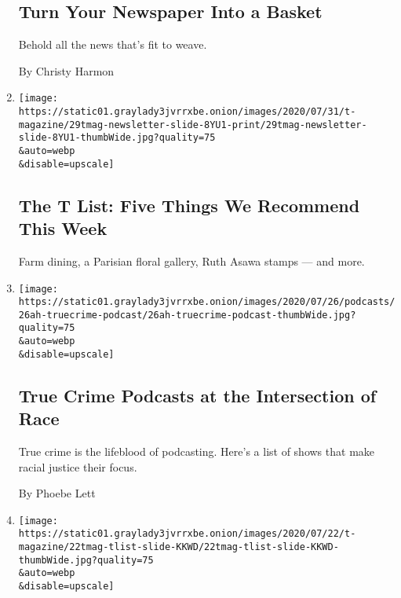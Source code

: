 \begin{enumerate}
  \hypertarget{turn-your-newspaper-into-a-basket}{%
  \subsection{Turn Your Newspaper Into a
  Basket}\label{turn-your-newspaper-into-a-basket}}

  Behold all the news that's fit to weave.

  By Christy Harmon
\item
  \href{/2020/07/30/t-magazine/the-t-list-five-things-we-recommend-this-week.html}{}

  \texttt{[image: https://static01.graylady3jvrrxbe.onion/images/2020/07/31/t-magazine/29tmag-newsletter-slide-8YU1-print/29tmag-newsletter-slide-8YU1-thumbWide.jpg?quality=75\\\&auto=webp\\\&disable=upscale]}

  \hypertarget{the-t-list-five-things-we-recommend-this-week-1}{%
  \subsection{The T List: Five Things We Recommend This
  Week}\label{the-t-list-five-things-we-recommend-this-week-1}}

  Farm dining, a Parisian floral gallery, Ruth Asawa stamps --- and
  more.
\item
  \href{/2020/07/25/at-home/coronavirus-true-crime-podcasts-race.html}{}

  \texttt{[image: https://static01.graylady3jvrrxbe.onion/images/2020/07/26/podcasts/26ah-truecrime-podcast/26ah-truecrime-podcast-thumbWide.jpg?quality=75\\\&auto=webp\\\&disable=upscale]}

  \hypertarget{true-crime-podcasts-at-the-intersection-of-race}{%
  \subsection{True Crime Podcasts at the Intersection of
  Race}\label{true-crime-podcasts-at-the-intersection-of-race}}

  True crime is the lifeblood of podcasting. Here's a list of shows that
  make racial justice their focus.

  By Phoebe Lett
\item
  \href{/2020/07/23/t-magazine/puzzles-bug-spray-tlist.html}{}

  \texttt{[image: https://static01.graylady3jvrrxbe.onion/images/2020/07/22/t-magazine/22tmag-tlist-slide-KKWD/22tmag-tlist-slide-KKWD-thumbWide.jpg?quality=75\\\&auto=webp\\\&disable=upscale]}


\end{enumerate}
